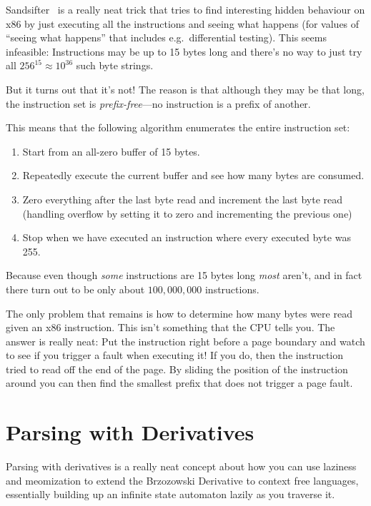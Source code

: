 \documentclass[a4paper]{book}
\begin{document}
Sandsifter~\cite{sandsifter} is a really neat trick that tries to find interesting hidden behaviour on x86 by just executing all the instructions and seeing what happens
(for values of ``seeing what happens'' that includes e.g.\ differential testing).
This seems infeasible:
Instructions may be up to 15 bytes long and there's no way to just try all \(256^{15} \approx 10^{36}\) such byte strings.

But it turns out that it's not!
The reason is that although they may be that long,
the instruction set is \emph{prefix-free}---no
instruction is a prefix of another.

This means that the following algorithm enumerates the entire instruction set:

\begin{enumerate}
\item Start from an all-zero buffer of 15 bytes.
\item Repeatedly execute the current buffer and see how many bytes are consumed.
\item Zero everything after the last byte read and increment the last byte read (handling overflow by setting it to zero and incrementing the previous one)
\item Stop when we have executed an instruction where every executed byte was 255.
\end{enumerate}

Because even though \emph{some} instructions are 15 bytes long \emph{most} aren't,
and in fact there turn out to be only about \(100,000,000\) instructions.

The only problem that remains is how to determine how many bytes were read given an x86 instruction.
This isn't something that the CPU tells you.
The answer is really neat:
Put the instruction right before a page boundary and watch to see if you trigger a fault when executing it!
If you do, then the instruction tried to read off the end of the page.
By sliding the position of the instruction around you can then find the smallest prefix that does not trigger a page fault.

\section{Parsing with Derivatives}

Parsing with derivatives\cite{DBLP:conf/icfp/MightDS11, DBLP:conf/pldi/0001HM16} is a really neat concept about how you can use laziness and meomization to extend the Brzozowski Derivative to context free languages,
essentially building up an infinite state automaton lazily as you traverse it.
\end{document}
